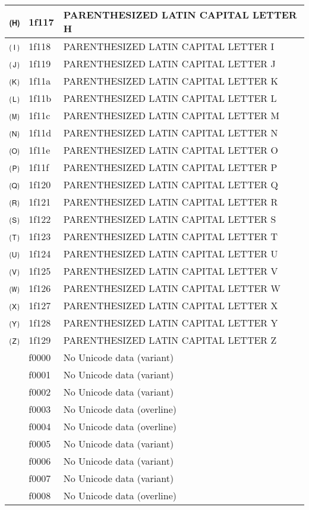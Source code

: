 \documentclass[12pt,letterpaper,openany]{book}
\begin{document}
\begin{center}
\begin{supertabular}{|m{0.25in}|m{0.5in}|m{4in}|}
🄗 & 1f117 & PARENTHESIZED LATIN CAPITAL LETTER H\\\hline
🄘 & 1f118 & PARENTHESIZED LATIN CAPITAL LETTER I\\\hline
🄙 & 1f119 & PARENTHESIZED LATIN CAPITAL LETTER J\\\hline
🄚 & 1f11a & PARENTHESIZED LATIN CAPITAL LETTER K\\\hline
🄛 & 1f11b & PARENTHESIZED LATIN CAPITAL LETTER L\\\hline
🄜 & 1f11c & PARENTHESIZED LATIN CAPITAL LETTER M\\\hline
🄝 & 1f11d & PARENTHESIZED LATIN CAPITAL LETTER N\\\hline
🄞 & 1f11e & PARENTHESIZED LATIN CAPITAL LETTER O\\\hline
🄟 & 1f11f & PARENTHESIZED LATIN CAPITAL LETTER P\\\hline
🄠 & 1f120 & PARENTHESIZED LATIN CAPITAL LETTER Q\\\hline
🄡 & 1f121 & PARENTHESIZED LATIN CAPITAL LETTER R\\\hline
🄢 & 1f122 & PARENTHESIZED LATIN CAPITAL LETTER S\\\hline
🄣 & 1f123 & PARENTHESIZED LATIN CAPITAL LETTER T\\\hline
🄤 & 1f124 & PARENTHESIZED LATIN CAPITAL LETTER U\\\hline
🄥 & 1f125 & PARENTHESIZED LATIN CAPITAL LETTER V\\\hline
🄦 & 1f126 & PARENTHESIZED LATIN CAPITAL LETTER W\\\hline
🄧 & 1f127 & PARENTHESIZED LATIN CAPITAL LETTER X\\\hline
🄨 & 1f128 & PARENTHESIZED LATIN CAPITAL LETTER Y\\\hline
🄩 & 1f129 & PARENTHESIZED LATIN CAPITAL LETTER Z\\\hline
󰀀 & f0000 & No Unicode data (variant)\\\hline
󰀁 & f0001 & No Unicode data (variant)\\\hline
󰀂 & f0002 & No Unicode data (variant)\\\hline
󰀃 & f0003 & No Unicode data (overline)\\\hline
󰀄 & f0004 & No Unicode data (overline)\\\hline
󰀅 & f0005 & No Unicode data (variant)\\\hline
󰀆 & f0006 & No Unicode data (variant)\\\hline
󰀇 & f0007 & No Unicode data (variant)\\\hline
󰀈 & f0008 & No Unicode data (overline)\\\hline

\end{supertabular}
\end{center}
\end{document}
